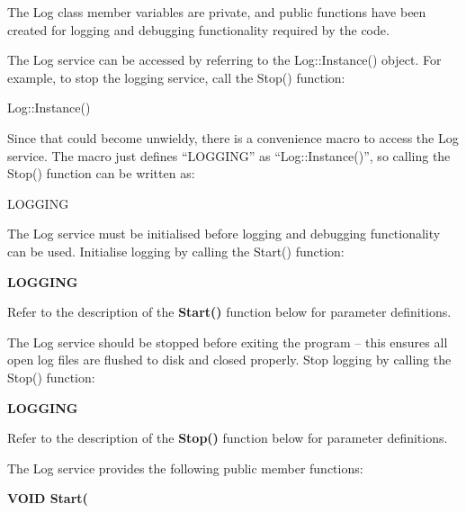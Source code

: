 The Log class member variables are private, and public functions have been created for logging and debugging functionality required by the code.

The Log service can be accessed by referring to the Log::Instance() object.  For example, to stop the logging service, call the Stop() function:

\tabto{3em}Log::Instance()

\bigskip
Since that could become unwieldy, there is a convenience macro to access the Log service.  The macro just defines ``LOGGING'' as ``Log::Instance()'', so calling the Stop() function can be written as:

\tabto{3em}LOGGING

\newpage
The Log service must be initialised before logging and debugging functionality can be used.  Initialise logging by calling the Start() function:

\medskip
\textbf{LOGGING\bm{}}

Refer to the description of the \textbf{Start()} function below for parameter definitions.

\bigskip
The Log service should be stopped before exiting the program -- this ensures all open log files are flushed to disk and closed properly. Stop logging by calling the Stop() function:

\medskip
\textbf{LOGGING\bm{}}

Refer to the description of the \textbf{Stop()} function below for parameter definitions.

\bigskip
The Log service provides the following public member functions:

\bigskip
\textbf{VOID Start(}

